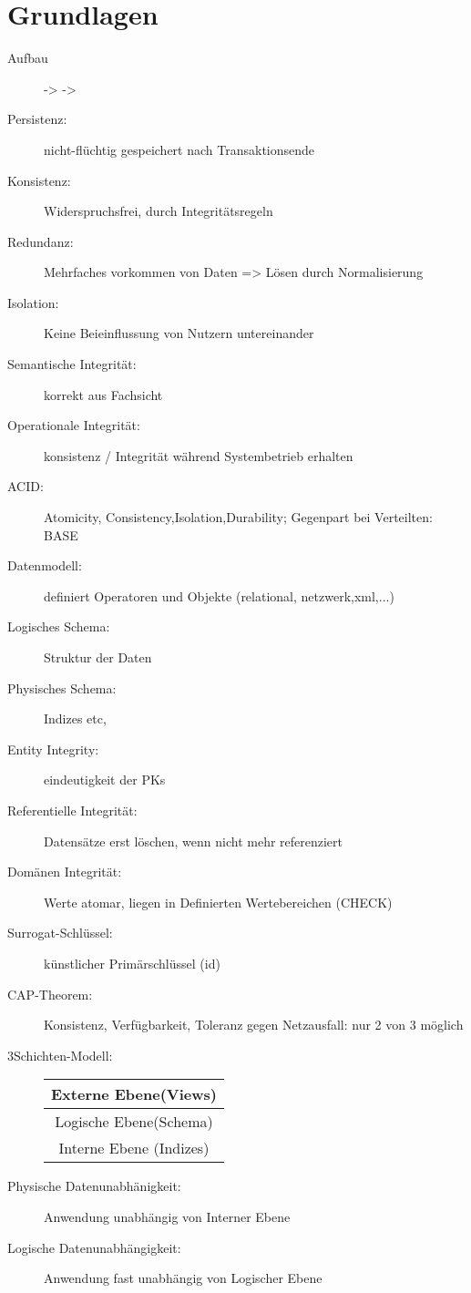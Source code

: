 \section{Grundlagen}

\begin{description}
\item[Aufbau]  ->  -> 
\item[Persistenz:] nicht-flüchtig gespeichert nach Transaktionsende
\item[Konsistenz:] Widerspruchsfrei, durch Integritätsregeln
\item[Redundanz:] Mehrfaches vorkommen von Daten => Lösen durch Normalisierung
\item[Isolation:] Keine Beieinflussung von Nutzern untereinander
\item[Semantische Integrität:] korrekt aus Fachsicht 
\item[Operationale Integrität:] konsistenz / Integrität während Systembetrieb erhalten
\item[ACID:] Atomicity, Consistency,Isolation,Durability; Gegenpart bei Verteilten: BASE
\item[Datenmodell:] definiert Operatoren und Objekte (relational, netzwerk,xml,...)
\item[Logisches Schema:] Struktur der Daten
\item[Physisches Schema:] Indizes etc,
\item[Entity Integrity:] eindeutigkeit der PKs
\item[Referentielle Integrität:] Datensätze erst löschen, wenn nicht mehr referenziert
\item[Domänen Integrität:] Werte atomar, liegen in Definierten Wertebereichen (CHECK)
\item[Surrogat-Schlüssel:] künstlicher Primärschlüssel (id)
\item[CAP-Theorem:] Konsistenz, Verfügbarkeit, Toleranz gegen Netzausfall: nur 2 von 3 möglich
\item[3Schichten-Modell:] \begin{minipage}{0.3\textwidth}
\begin{tabular}{|c|}
\hline
Externe Ebene(Views) \\\hline Logische Ebene(Schema) \\\hline Interne Ebene (Indizes)\\\hline
\end{tabular}\end{minipage}
\item[Physische Datenunabhänigkeit:] Anwendung unabhängig von Interner Ebene 
\item[Logische Datenunabhängigkeit:] Anwendung fast unabhängig von Logischer Ebene 
\end{description}


